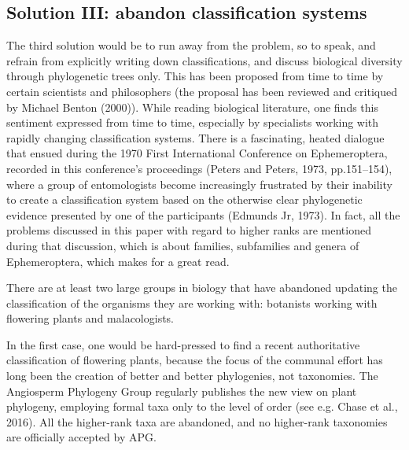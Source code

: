 \begin{artengenv}
\subsection{Solution III: abandon classification systems}

The third solution would be to run away from the problem, so to speak, and refrain from explicitly writing down
classifications, and discuss biological diversity through phylogenetic trees only. This has been proposed from time to
time by certain scientists and philosophers (the proposal has been reviewed and critiqued by Michael Benton
\label{ref:RNDvl4WtKWtke}(2000)). While reading biological literature, one finds this sentiment expressed from time to
time, especially by specialists working with rapidly changing classification systems. There is a fascinating, heated
dialogue that ensued during the 1970 First International Conference on Ephemeroptera, recorded in this conference’s
proceedings \label{ref:RNDKBHKSFREeT}(Peters and Peters, 1973, pp.151–154), where a group of entomologists become
increasingly frustrated by their inability to create a classification system based on the otherwise clear phylogenetic
evidence presented by one of the participants \label{ref:RNDRwD3oy2Fl1}(Edmunds Jr, 1973). In fact, all the problems
discussed in this paper with regard to higher ranks are mentioned during that discussion, which is about families,
subfamilies and genera of Ephemeroptera, which makes for a great read.

There are at least two large groups in biology that have abandoned updating the classification of the organisms they are
working with: botanists working with flowering plants and malacologists.

In the first case, one would be hard-pressed to find a recent authoritative classification of flowering plants, because
the focus of the communal effort has long been the creation of better and better phylogenies, not taxonomies. The
Angiosperm Phylogeny Group regularly publishes the new view on plant phylogeny, employing formal taxa only to the level
of order \label{ref:RNDly7gwmyvG1}(see e.g. Chase et al., 2016). All the higher-rank taxa are abandoned, and no
higher-rank taxonomies are officially accepted by APG.


\end{artengenv}
